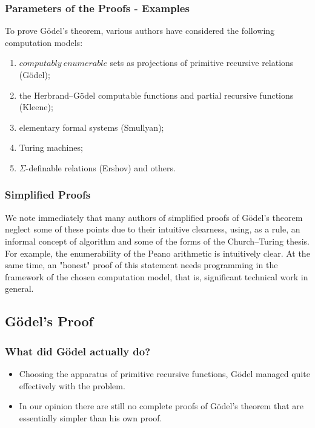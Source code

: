 \documentclass[aspectratio=169]{beamer}
\begin{document}
\begin{frame}
	\frametitle{Parameters of the Proofs - Examples}
	To prove Gödel’s theorem, various authors have considered the following computation models: \\
	\begin{enumerate}
		\item $computably~enumerable$ sets as projections of primitive recursive relations (Gödel);
		\item the Herbrand–Gödel computable functions and partial recursive functions (Kleene);
		\item elementary formal systems (Smullyan);
		\item Turing machines;
		\item $\Sigma$-definable relations (Ershov) and others.
	\end{enumerate}
	\begin{flushright}
		\cite{bekl}
	\end{flushright}
\end{frame}

\begin{frame}
	\frametitle{Simplified Proofs}
	We note immediately that many authors of simplified proofs of Gödel's theorem neglect some of these points due to their intuitive clearness, using, as a rule, an informal concept of algorithm and some of the forms of the Church–Turing thesis. For example, the enumerability of the Peano arithmetic is intuitively clear. At the same time, an "honest" proof of this statement needs programming in the framework of the chosen computation model, that is, significant technical work in general.
	\begin{flushright}
		\cite{bekl}
	\end{flushright}
\end{frame}

\subsection{Gödel's Proof}
\begin{frame}
	\frametitle{What did Gödel actually do?}
	\begin{itemize}
		\item Choosing the apparatus of primitive recursive functions, Gödel managed quite effectively with the problem.
		\item In our opinion there are still no complete proofs of Gödel’s theorem that are essentially simpler than his own proof.
	\end{itemize}
	\begin{flushright}
		\cite{bekl}
	\end{flushright}
\end{frame}
\end{document}
